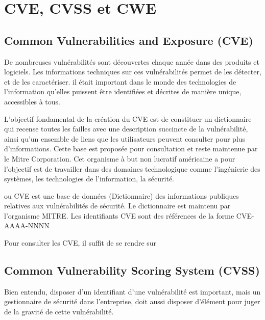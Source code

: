 
\section{CVE, CVSS et CWE}




\subsection{Common Vulnerabilities and Exposure (CVE)}

De nombreuses vulnérabilités sont découvertes chaque année dans des produits et logiciels. Les informations techniques sur ces vulnérabilités permet de les détecter, et de les caractériser. il était important dans le monde des technologies de l'information qu'elles puissent être identifiées et décrites de manière unique, accessibles à tous.

L’objectif fondamental de la création du CVE est de constituer un dictionnaire qui recense toutes les failles avec une description succincte de la vulnérabilité, ainsi qu’un ensemble de liens que les utilisateurs peuvent consulter pour plus d’informations. Cette base  est proposée pour consultation et reste maintenue par le Mitre Corporation.  Cet organisme à but non lucratif américaine a pour  l'objectif est de travailler dans des domaines technologique comme l'ingénierie des systèmes, les technologies de l'information, la sécurité. 


 ou CVE est une base de données (Dictionnaire) des informations publiques relatives aux vulnérabilités de sécurité. Le dictionnaire est maintenu par l'organisme MITRE.  Les identifiants CVE sont des références de la forme CVE-AAAA-NNNN 
 
 Pour consulter les CVE,  il suffit de se rendre sur 


\subsection{Common Vulnerability Scoring System (CVSS)}

Bien entendu, disposer d'un identifiant d'une vulnérabilité est important, mais  un gestionnaire de sécurité dans l'entreprise, doit aussi disposer d'élément pour juger de la gravité de cette vulnérabilité. 

